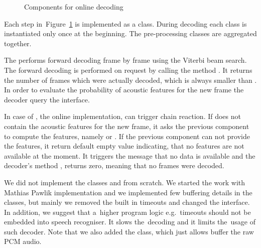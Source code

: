 \begin{figure}[!htp]
    \begin{center}
        
        \caption{Components for online decoding}
    \label{fig:online_pipeline} 
    \end{center}
\end{figure}

Each step in~Figure~\ref{fig:online_pipeline} is implemented as a class.
During decoding each class is instantiated only once at the beginning.
The pre-processing classes are aggregated together. 

The \/ performs forward decoding frame by frame using the Viterbi beam search.
The forward decoding is performed on request by calling the method .
It returns the number of frames which were actually decoded, which is always smaller than .
In order to evaluate the probability of acoustic features for the new frame
the decoder query the \/ interface.

In case of , the online implementation, can trigger chain reaction.
If \/ does not contain the acoustic features for the new frame, it asks
the previous component to compute the features, namely \/ or \/.
If the previous component can not provide the features, it return default empty value indicating,
that no features are not available at the moment. It triggers the message that no data is available
and the decoder's method , returns zero, meaning that no frames were decoded.


We did not implement the classes \/ and \/
from scratch. We started the work with Mathias Pawlik implementation and we implemented few buffering details
in the classes, but mainly we removed the built in timeouts and changed the interface.
In addition, we suggest that a~higher program logic e.g.\ timeouts should not be embedded into speech recogniser.
It slows the~decoding and it limits the~usage of such decoder.
Note that we also added the \/ class, which just allows buffer the raw \ac{PCM} audio.






